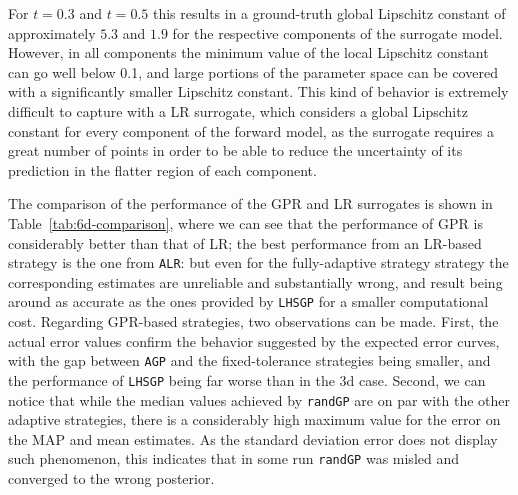 For $t=0.3$ and $t=0.5$ this results in a ground-truth global Lipschitz constant of approximately $ 5.3$ and $1.9$ for the respective components of the surrogate model.
However, in all components the minimum value of the local Lipschitz constant can go well below 0.1, and large portions of the parameter space can be covered with a significantly smaller Lipschitz constant.
This kind of behavior is extremely difficult to capture with a LR surrogate, which considers a global Lipschitz constant for every component of the forward model, as the surrogate requires a great number of points in order to be able to reduce the uncertainty of its prediction in the flatter region of each component.\medskip

The comparison of the performance of the GPR and LR surrogates is shown in Table~\ref{tab:6d-comparison}, where we can see that the performance of GPR is considerably better than that of LR; the best performance from an LR-based strategy is the one from \texttt{ALR}: but even for the fully-adaptive strategy strategy the corresponding estimates are unreliable and substantially wrong, and result being around as accurate as the ones provided by \texttt{LHSGP} for a smaller computational cost.
Regarding GPR-based strategies, two observations can be made.
First, the actual error values confirm the behavior suggested by the expected error curves, with the gap between \texttt{AGP} and the fixed-tolerance strategies being smaller, and the performance of \texttt{LHSGP} being far worse than in the 3d case.
Second, we can notice that while the median values achieved by \texttt{randGP} are on par with the other adaptive strategies, there is a considerably high maximum value for the error on the MAP and mean estimates.
As the standard deviation error does not display such phenomenon, this indicates that in some run \texttt{randGP} was misled and converged to the wrong posterior.

